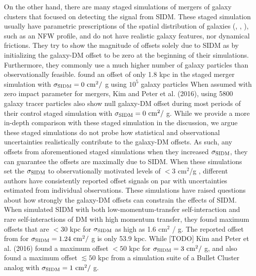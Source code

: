 On the other hand, there are many staged simulations of mergers of galaxy
clusters that focused on detecting the signal from
SIDM. These staged simulation usually have parametric prescriptions of the 
spatial distribution of galaxies  
(\citealt{Randall2008d}, \citealt{Kahlhoefer14}, \citealt{Robertson2016}), 
such as an NFW profile, 
and do not have realistic galaxy features, nor dynamical
frictions. 
They try to show the magnitude of offsets solely due to SIDM \citep{Kahlhoefer14} as 
by initializing the galaxy-DM offset to be zero at the beginning of their 
simulations. 
Furthermore, they commonly use a much higher number of galaxy particles than
observationally feasible. 
\cite{Randall2008d} found an offset of only 1.8 kpc in the staged merger
simulation with $\sigma_{\rm SIDM} = 0 {\rm~cm}^2 /$ g using $10^5$ 
galaxy particles 
When assumed with zero impact parameter for mergers, Kim and Peter et al.
(2016), using 5800 galaxy tracer particles also show 
null galaxy-DM offset during most periods of their control staged simulation 
with $\sigma_{\rm
SIDM} = 0 {\rm~cm}^2 /$ g. While we provide a more in-depth comparison with
these staged simulation in the discussion, we argue 
these staged simulations do not probe  
how statistical and observational uncertainties realistically contribute to 
the galaxy-DM offsets. 
As such, any offsets 
from aforementioned staged simulations when they increased $\sigma_{\rm
SIDM}$, they can guarantee the offsets are maximally due to SIDM.
When these simulations set the $\sigma_{\rm SIDM}$ to observationally motivated levels of $< 3$ cm$^2$/g , 
different authors have consistently reported offset signals  
on par with uncertainties estimated from individual observations. 
These simulations have raised questions about how strongly the galaxy-DM offsets can constrain the effects of SIDM.
When \cite{Kahlhoefer14} simulated SIDM with both low-momentum-transfer self-interaction 
and rare self-interactions of DM with high momentum transfer, they found maximum 
offsets that are $< 30$ kpc for $\sigma_{\rm SIDM}$ as high as 1.6 cm$^2$ / g.
The reported offset from \cite{Randall2008d}
for $\sigma_{\rm SIDM} = 1.24 {\rm~cm}^2 /$ g is only 53.9 kpc. 
While [TODO] Kim and Peter et al. (2016) found a maximum offset $< 50$ kpc for 
$\sigma_{\rm SIDM} = 3 {\rm~cm}^2 /$ g,
and \cite{Robertson2016} also found a maximum offset $\lesssim 50$ kpc  
 from a simulation suite of a Bullet Cluster analog 
 with $\sigma_{\rm SIDM} = 1 {\rm~cm}^2 /$ g.

